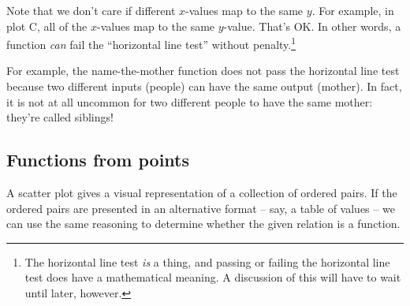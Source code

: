 Note that we don't care if different $x$-values map to the same $y$. For example, in plot C, all of the $x$-values map to the same $y$-value. That's OK. In other words, a function \textit{can} fail the ``horizontal line test'' without penalty.\footnote{The horizontal line test \textit{is} a thing, and passing or failing the horizontal line test does have a mathematical meaning. A discussion of this will have to wait until later, however.}

For example, the name-the-mother function does not pass the horizontal line test because two different inputs (people) can have the same output (mother). In fact, it is not at all uncommon for two different people to have the same mother: they're called siblings!

\subsection{Functions from points}

A scatter plot gives a visual representation of a collection of ordered pairs. If the ordered pairs are presented in an alternative format -- say, a table of values -- we can use the same reasoning to determine whether the given relation is a function.

